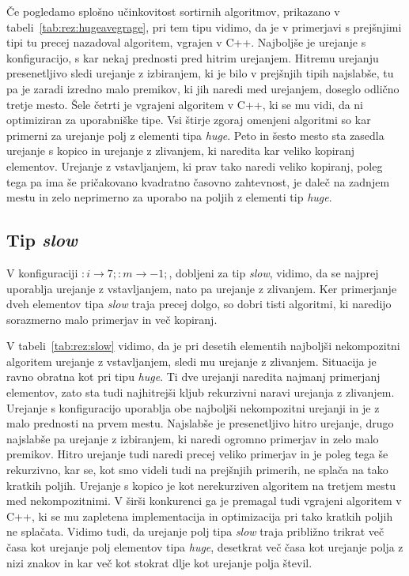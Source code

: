\documentclass[a4paper,oneside,12pt]{article}
\newcommand{\lra}{\ensuremath{\longrightarrow}}
\begin{document}
Če pogledamo splošno učinkovitost sortirnih algoritmov, prikazano v
tabeli~\ref{tab:rez:hugeavegrage}, pri tem tipu vidimo, da
je v primerjavi s prejšnjimi tipi tu precej nazadoval algoritem, vgrajen v C++.
Najboljše je urejanje s konfiguracijo, s kar nekaj prednosti pred hitrim
urejanjem. Hitremu urejanju presenetljivo sledi urejanje z izbiranjem, ki je
bilo v prejšnjih tipih najslabše, tu pa je zaradi izredno malo premikov, ki jih
naredi med urejanjem, doseglo odlično tretje mesto. Šele četrti je vgrajeni
algoritem v C++, ki se mu vidi, da ni optimiziran za uporabniške tipe. Vsi
štirje zgoraj omenjeni algoritmi so kar primerni za urejanje polj z elementi
tipa \emph{huge}. Peto in šesto mesto sta zasedla urejanje s kopico in urejanje
z zlivanjem, ki naredita kar veliko kopiranj elementov. Urejanje z vstavljanjem, ki
prav tako naredi veliko kopiranj, poleg tega pa ima še pričakovano kvadratno časovno
zahtevnost, je daleč na zadnjem mestu in zelo neprimerno za uporabo na poljih z
elementi tip \emph{huge}. 

\subsection{Tip \emph{slow}}
V konfiguraciji
$:i \lra 7;:m \lra -1;$, dobljeni za tip \emph{slow}, 
vidimo, da se najprej uporablja urejanje z vstavljanjem, nato pa
urejanje z zlivanjem. Ker primerjanje dveh elementov tipa \emph{slow} traja 
precej dolgo, so dobri tisti algoritmi, ki
naredijo sorazmerno malo primerjav in več kopiranj. 

V tabeli~\ref{tab:rez:slow} vidimo, da je pri desetih elementih najboljši nekompozitni algoritem urejanje z
vstavljanjem, sledi mu urejanje z zlivanjem. Situacija je ravno
obratna kot pri tipu \emph{huge}. Ti dve urejanji naredita najmanj primerjanj
elementov, zato sta tudi najhitrejši kljub rekurzivni naravi urejanja z
zlivanjem. Urejanje s konfiguracijo uporablja obe
najboljši nekompozitni urejanji in je z malo prednosti na prvem mestu. Najslabše
je presenetljivo hitro urejanje, drugo najslabše pa urejanje z izbiranjem, ki
naredi ogromno primerjav in zelo malo premikov. Hitro urejanje tudi naredi
precej veliko primerjav in je poleg tega še rekurzivno, kar se, kot smo videli tudi
na prejšnjih primerih, ne splača na tako kratkih poljih. Urejanje s kopico je kot
nerekurziven algoritem na tretjem mestu med nekompozitnimi. V širši
konkurenci ga je premagal tudi vgrajeni algoritem v C++, ki se mu zapletena
implementacija in optimizacija pri tako kratkih poljih ne splačata.
Vidimo tudi, da urejanje polj tipa \emph{slow} traja približno trikrat več časa kot
urejanje polj elementov tipa \emph{huge}, desetkrat več časa kot urejanje polja
z nizi znakov in kar več kot stokrat dlje kot urejanje polja števil.
\end{document}
